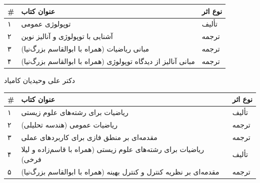 \documentclass[
  letterpaper,
  DIV=11,
  numbers=noendperiod]{scrreprt}
\newcounter{none} %
\begin{document}
{\def\LTcaptype{none} %
\begin{longtable}[]{@{}
  >{\raggedright\arraybackslash}p{}
  >{\raggedright\arraybackslash}p{}
  >{\raggedright\arraybackslash}p{}@{}}
\toprule\noalign{}
\begin{minipage}[b]{\linewidth}\raggedright
\#
\end{minipage} & \begin{minipage}[b]{\linewidth}\raggedright
عنوان کتاب
\end{minipage} & \begin{minipage}[b]{\linewidth}\raggedright
نوع اثر
\end{minipage} \\
\midrule\noalign{}
\endhead
\bottomrule\noalign{}
\endlastfoot
۱ & توپولوژی عمومی & تألیف \\
۲ & آشنایی با توپولوژی و آنالیز نوین & ترجمه \\
۳ & مبانی ریاضیات (همراه با ابوالقاسم بزرگ‌نیا) & ترجمه \\
۴ & مبانی آنالیز از دیدگاه توپولوژی (همراه با ابوالقاسم بزرگ‌نیا) &
ترجمه \\
\end{longtable}
}

دکتر علی وحیدیان کامیاد

{\def\LTcaptype{none} %
\begin{longtable}[]{@{}
  >{\raggedright\arraybackslash}p{}
  >{\raggedright\arraybackslash}p{}
  >{\raggedright\arraybackslash}p{}@{}}
\toprule\noalign{}
\begin{minipage}[b]{\linewidth}\raggedright
\#
\end{minipage} & \begin{minipage}[b]{\linewidth}\raggedright
عنوان کتاب
\end{minipage} & \begin{minipage}[b]{\linewidth}\raggedright
نوع اثر
\end{minipage} \\
\midrule\noalign{}
\endhead
\bottomrule\noalign{}
\endlastfoot
۱ & ریاضیات برای رشته‌های علوم زیستی & تألیف \\
۲ & ریاضیات عمومی (هندسه تحلیلی) & ترجمه \\
۳ & مقدمه‌ای بر منطق فازی برای کاربردهای عملی & ترجمه \\
۴ & ریاضیات برای رشته‌های علوم زیستی (همراه با قاسم‌زاده و لیلا فرخی) &
تألیف \\
۵ & مقدمه‌ای بر نظریه کنترل و کنترل بهینه (همراه با ابوالقاسم بزرگ‌نیا) &
ترجمه \\
\end{longtable}
}
\end{document}
